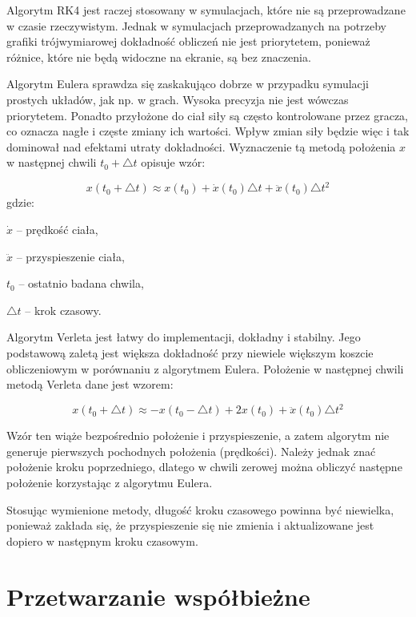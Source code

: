 \documentclass[12pt, twoside, openany]{report}
\begin{document}
Algorytm RK4 jest raczej stosowany w symulacjach, które nie są przeprowadzane w czasie rzeczywistym. Jednak w symulacjach przeprowadzanych na potrzeby grafiki trójwymiarowej dokładność obliczeń nie jest priorytetem, ponieważ różnice, które nie będą widoczne na ekranie, są bez znaczenia.

Algorytm Eulera sprawdza się zaskakująco dobrze w przypadku symulacji prostych układów, jak np. w grach. Wysoka precyzja nie jest wówczas priorytetem. Ponadto przyłożone do ciał siły są często kontrolowane przez gracza, co oznacza nagłe i częste zmiany ich wartości. Wpływ zmian siły będzie więc i tak dominował nad efektami utraty dokładności. Wyznaczenie tą metodą położenia $x$ w następnej chwili $t_0 + \triangle t$ opisuje wzór:

\begin{equation}
\label{eq:euler}
x(t_0 + \triangle t) \approx x(t_0) + \dot{x} (t_0) \triangle t + \ddot{x} (t_0) \triangle t^2
\end{equation}
gdzie:

\indent $ \dot{x} $ -- prędkość ciała,

\indent $ \ddot{x} $ -- przyspieszenie ciała,

\indent $ t_0 $ -- ostatnio badana chwila,

\indent $ \triangle t $ -- krok czasowy.

\bigskip

Algorytm Verleta jest łatwy do implementacji, dokładny i stabilny. Jego podstawową zaletą jest większa dokładność przy niewiele większym koszcie obliczeniowym w porównaniu z algorytmem Eulera. Położenie w następnej chwili metodą Verleta dane jest wzorem:

\begin{equation}
\label{eq:verlet}
x(t_0 + \triangle t) \approx -x(t_0 - \triangle t) + 2x(t_0) + \ddot{x} (t_0) \triangle t^2
\end{equation}

Wzór ten wiąże bezpośrednio położenie i przyspieszenie, a zatem algorytm nie generuje pierwszych pochodnych położenia (prędkości).
Należy jednak znać położenie kroku poprzedniego, dlatego w chwili zerowej można obliczyć następne położenie korzystając z algorytmu Eulera.

Stosując wymienione metody, długość kroku czasowego powinna być niewielka, ponieważ zakłada się, że przyspieszenie się nie zmienia i aktualizowane jest dopiero w następnym kroku czasowym.


\chapter{Przetwarzanie współbieżne}
\end{document}
